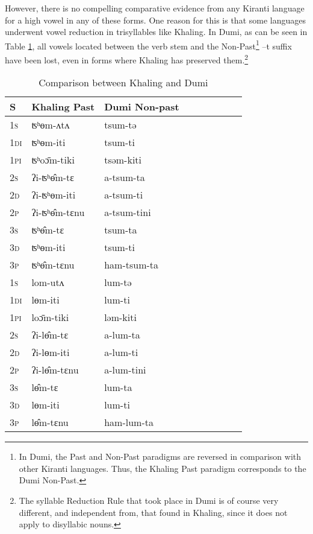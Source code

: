 \documentclass[oldfontcommands,oneside,a4paper,11pt]{article}
\newcommand{\ipa}[1]{{\phon \mbox{#1}}} %
\begin{document}
However, there is no compelling comparative evidence from any Kiranti language for a high vowel in any of these forms. One reason for this is that some languages underwent vowel reduction in trisyllables like Khaling. In Dumi, as can be seen in Table \ref{tab:intrans.dumi}, all vowels located between the verb stem and the Non-Past\footnote{In Dumi, the Past and Non-Past paradigms are reversed in comparison with other Kiranti languages. Thus, the Khaling Past paradigm corresponds to the Dumi Non-Past.} \ipa{--t} suffix  have been lost, even in forms where Khaling has preserved them.\footnote{The syllable Reduction Rule that took place in Dumi is of course very different, and independent from, that found in Khaling, since it does not apply to disyllabic nouns.}

 
\begin{table}[h]
\caption{Comparison between Khaling and Dumi } \label{tab:intrans.dumi} \centering
\begin{tabular}{lllllllll}
\toprule
S & Khaling Past & Dumi Non-past&  \\
\midrule
\textsc{1s} &   \ipa{ʦʰɵm-ʌtʌ} &  \ipa{tsum-tə} \\
\textsc{1di} &    \ipa{ʦʰɵm-iti}& \ipa{tsum-ti} \\
\textsc{1pi} &    \ipa{ʦʰoɔ̄m-tiki} &\ipa{tsəm-kiti}\\
\textsc{2s}   &\ipa{ʔi-ʦʰɵ̂m-tɛ}  & \ipa{a-tsum-ta} \\
\textsc{2d}   &\ipa{ʔi-ʦʰɵm-iti} &  \ipa{a-tsum-ti}\\
\textsc{2p}  & \ipa{ʔi-ʦʰɵ̂m-tɛnu} &  \ipa{a-tsum-tini} \\
\textsc{3s}  &\ipa{ʦʰɵ̂m-tɛ} & \ipa{tsum-ta}\\
\textsc{3d}   &\ipa{ʦʰɵm-iti} &\ipa{tsum-ti}\\
\textsc{3p}  & \ipa{ʦʰɵ̂m-tɛnu} &\ipa{ham-tsum-ta} \\
\midrule
\textsc{1s} &   \ipa{lom-utʌ} &  \ipa{lum-tə} &\\
\textsc{1di} &    \ipa{lɵm-iti}& \ipa{lum-ti}& \\
\textsc{1pi} &    \ipa{loɔ̄m-tiki} &\ipa{ləm-kiti}&\\
\textsc{2s}   &\ipa{ʔi-lɵ̂m-tɛ}  & \ipa{a-lum-ta}& \\
\textsc{2d}   &\ipa{ʔi-lɵm-iti} &  \ipa{a-lum-ti}&\\
\textsc{2p}  & \ipa{ʔi-lɵ̂m-tɛnu} &  \ipa{a-lum-tini} &\\
\textsc{3s}  &\ipa{lɵ̂m-tɛ} & \ipa{lum-ta}&\\
\textsc{3d}   &\ipa{lɵm-iti} &\ipa{lum-ti}&\\
\textsc{3p}  & \ipa{lɵ̂m-tɛnu} &\ipa{ham-lum-ta}& \\
\bottomrule
\end{tabular}
\end{table}
\end{document}
